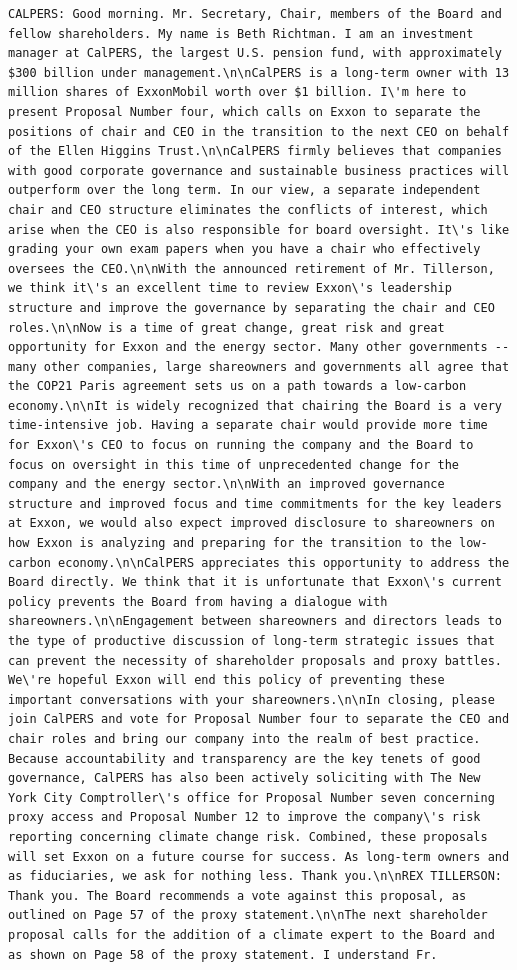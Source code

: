 \documentclass[
  letterpaper,
  DIV=11,
  numbers=noendperiod]{scrreprt}
\begin{document}
\begin{verbatim}
CALPERS: Good morning. Mr. Secretary, Chair, members of the Board and fellow shareholders. My name is Beth Richtman. I am an investment manager at CalPERS, the largest U.S. pension fund, with approximately $300 billion under management.\n\nCalPERS is a long-term owner with 13 million shares of ExxonMobil worth over $1 billion. I\'m here to present Proposal Number four, which calls on Exxon to separate the positions of chair and CEO in the transition to the next CEO on behalf of the Ellen Higgins Trust.\n\nCalPERS firmly believes that companies with good corporate governance and sustainable business practices will outperform over the long term. In our view, a separate independent chair and CEO structure eliminates the conflicts of interest, which arise when the CEO is also responsible for board oversight. It\'s like grading your own exam papers when you have a chair who effectively oversees the CEO.\n\nWith the announced retirement of Mr. Tillerson, we think it\'s an excellent time to review Exxon\'s leadership structure and improve the governance by separating the chair and CEO roles.\n\nNow is a time of great change, great risk and great opportunity for Exxon and the energy sector. Many other governments -- many other companies, large shareowners and governments all agree that the COP21 Paris agreement sets us on a path towards a low-carbon economy.\n\nIt is widely recognized that chairing the Board is a very time-intensive job. Having a separate chair would provide more time for Exxon\'s CEO to focus on running the company and the Board to focus on oversight in this time of unprecedented change for the company and the energy sector.\n\nWith an improved governance structure and improved focus and time commitments for the key leaders at Exxon, we would also expect improved disclosure to shareowners on how Exxon is analyzing and preparing for the transition to the low-carbon economy.\n\nCalPERS appreciates this opportunity to address the Board directly. We think that it is unfortunate that Exxon\'s current policy prevents the Board from having a dialogue with shareowners.\n\nEngagement between shareowners and directors leads to the type of productive discussion of long-term strategic issues that can prevent the necessity of shareholder proposals and proxy battles. We\'re hopeful Exxon will end this policy of preventing these important conversations with your shareowners.\n\nIn closing, please join CalPERS and vote for Proposal Number four to separate the CEO and chair roles and bring our company into the realm of best practice. Because accountability and transparency are the key tenets of good governance, CalPERS has also been actively soliciting with The New York City Comptroller\'s office for Proposal Number seven concerning proxy access and Proposal Number 12 to improve the company\'s risk reporting concerning climate change risk. Combined, these proposals will set Exxon on a future course for success. As long-term owners and as fiduciaries, we ask for nothing less. Thank you.\n\nREX TILLERSON: Thank you. The Board recommends a vote against this proposal, as outlined on Page 57 of the proxy statement.\n\nThe next shareholder proposal calls for the addition of a climate expert to the Board and as shown on Page 58 of the proxy statement. I understand Fr. 
\end{verbatim}
\end{document}
